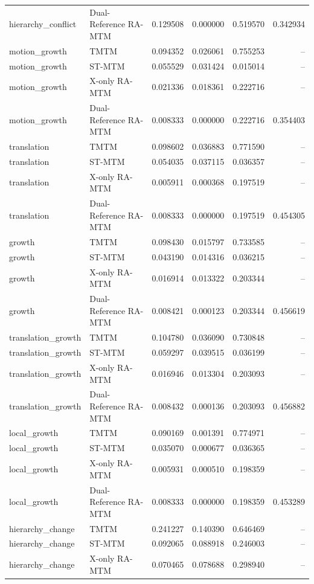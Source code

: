 \begin{tabular}{llrrrr}
hierarchy\_conflict & Dual-Reference RA-MTM & 0.129508 & 0.000000 & 0.519570 & 0.342934 \\
motion\_growth & TMTM & 0.094352 & 0.026061 & 0.755253 & -- \\
motion\_growth & ST-MTM & 0.055529 & 0.031424 & 0.015014 & -- \\
motion\_growth & X-only RA-MTM & 0.021336 & 0.018361 & 0.222716 & -- \\
motion\_growth & Dual-Reference RA-MTM & 0.008333 & 0.000000 & 0.222716 & 0.354403 \\
translation & TMTM & 0.098602 & 0.036883 & 0.771590 & -- \\
translation & ST-MTM & 0.054035 & 0.037115 & 0.036357 & -- \\
translation & X-only RA-MTM & 0.005911 & 0.000368 & 0.197519 & -- \\
translation & Dual-Reference RA-MTM & 0.008333 & 0.000000 & 0.197519 & 0.454305 \\
growth & TMTM & 0.098430 & 0.015797 & 0.733585 & -- \\
growth & ST-MTM & 0.043190 & 0.014316 & 0.036215 & -- \\
growth & X-only RA-MTM & 0.016914 & 0.013322 & 0.203344 & -- \\
growth & Dual-Reference RA-MTM & 0.008421 & 0.000123 & 0.203344 & 0.456619 \\
translation\_growth & TMTM & 0.104780 & 0.036090 & 0.730848 & -- \\
translation\_growth & ST-MTM & 0.059297 & 0.039515 & 0.036199 & -- \\
translation\_growth & X-only RA-MTM & 0.016946 & 0.013304 & 0.203093 & -- \\
translation\_growth & Dual-Reference RA-MTM & 0.008432 & 0.000136 & 0.203093 & 0.456882 \\
local\_growth & TMTM & 0.090169 & 0.001391 & 0.774971 & -- \\
local\_growth & ST-MTM & 0.035070 & 0.000677 & 0.036365 & -- \\
local\_growth & X-only RA-MTM & 0.005931 & 0.000510 & 0.198359 & -- \\
local\_growth & Dual-Reference RA-MTM & 0.008333 & 0.000000 & 0.198359 & 0.453289 \\
hierarchy\_change & TMTM & 0.241227 & 0.140390 & 0.646469 & -- \\
hierarchy\_change & ST-MTM & 0.092065 & 0.088918 & 0.246003 & -- \\
hierarchy\_change & X-only RA-MTM & 0.070465 & 0.078688 & 0.298940 & -- \\

\end{tabular}
